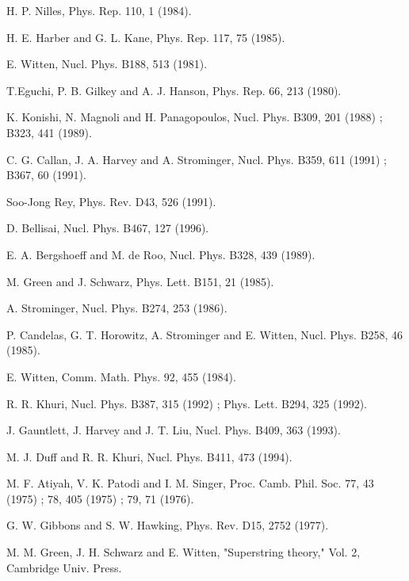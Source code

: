 \documentclass[a4paper,aps, amssymb, preprint, 12pt]{revtex4}
\begin{document}
\begin{thebibliography}{99}
H. P. Nilles, Phys. Rep. 110, 1 (1984).

H. E. Harber and G. L. Kane, Phys. Rep. 117, 75 (1985).

E. Witten, Nucl. Phys. B188, 513 (1981).

T.Eguchi, P. B. Gilkey and A. J. Hanson, Phys. Rep. 66, 213 (1980).

K. Konishi, N. Magnoli and H. Panagopoulos, Nucl. Phys. B309, 201 (1988) ; B323, 441 (1989).

C. G. Callan, J. A. Harvey and A. Strominger, Nucl. Phys. B359, 611 (1991) ; B367, 60 (1991).

Soo-Jong Rey, Phys. Rev. D43, 526 (1991).

D. Bellisai, Nucl. Phys. B467, 127 (1996).

E. A. Bergshoeff and M. de Roo, Nucl. Phys. B328, 439 (1989).

M. Green and J. Schwarz, Phys. Lett. B151, 21 (1985).





A. Strominger, Nucl. Phys. B274, 253 (1986).

P. Candelas, G. T. Horowitz, A. Strominger and E. Witten, Nucl. Phys. B258, 46 (1985).

E. Witten, Comm. Math. Phys. 92, 455 (1984).



R. R. Khuri, Nucl. Phys. B387, 315 (1992) ; Phys. Lett. B294, 325 (1992).

J. Gauntlett, J. Harvey and J. T. Liu, Nucl. Phys. B409, 363 (1993).

M. J. Duff and R. R. Khuri, Nucl. Phys. B411, 473 (1994).

M. F. Atiyah, V. K. Patodi and I. M. Singer, Proc. Camb. Phil. Soc. 77, 43 (1975) ; 78, 405  (1975) ; 79, 71 (1976).



G. W. Gibbons and S. W. Hawking, Phys. Rev. D15, 2752 (1977).

M. M. Green, J. H. Schwarz and E. Witten, "Superstring theory," Vol. 2, Cambridge Univ. Press.



\end{thebibliography}
\end{document}
